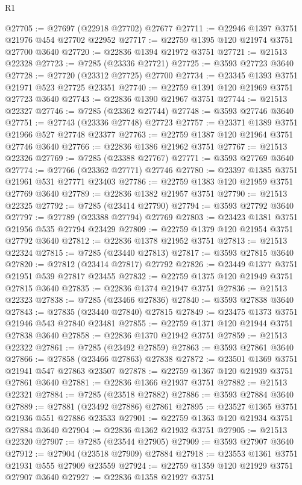 \begin{lexlean}{R1}
\begin{coremodule}
@27705 := @27697 (@22918 @27702) @27677
@27711 := @22946 @1397 @3751 @21976 @454 @27702 @22952
@27717 := @22759 @1395 @120 @21974 @3751 @27700 @3640
@27720 := @22836 @1394 @21972 @3751
@27721 := @21513 @22328
@27723 := @7285 (@23336 @27721)
@27725 := @3593 @27723 @3640
@27728 := @27720 (@23312 @27725) @27700
@27734 := @23345 @1393 @3751 @21971 @523 @27725 @23351
@27740 := @22759 @1391 @120 @21969 @3751 @27723 @3640
@27743 := @22836 @1390 @21967 @3751
@27744 := @21513 @22327
@27746 := @7285 (@23362 @27744)
@27748 := @3593 @27746 @3640
@27751 := @27743 (@23336 @27748) @27723
@27757 := @23371 @1389 @3751 @21966 @527 @27748 @23377
@27763 := @22759 @1387 @120 @21964 @3751 @27746 @3640
@27766 := @22836 @1386 @21962 @3751
@27767 := @21513 @22326
@27769 := @7285 (@23388 @27767)
@27771 := @3593 @27769 @3640
@27774 := @27766 (@23362 @27771) @27746
@27780 := @23397 @1385 @3751 @21961 @531 @27771 @23403
@27786 := @22759 @1383 @120 @21959 @3751 @27769 @3640
@27789 := @22836 @1382 @21957 @3751
@27790 := @21513 @22325
@27792 := @7285 (@23414 @27790)
@27794 := @3593 @27792 @3640
@27797 := @27789 (@23388 @27794) @27769
@27803 := @23423 @1381 @3751 @21956 @535 @27794 @23429
@27809 := @22759 @1379 @120 @21954 @3751 @27792 @3640
@27812 := @22836 @1378 @21952 @3751
@27813 := @21513 @22324
@27815 := @7285 (@23440 @27813)
@27817 := @3593 @27815 @3640
@27820 := @27812 (@23414 @27817) @27792
@27826 := @23449 @1377 @3751 @21951 @539 @27817 @23455
@27832 := @22759 @1375 @120 @21949 @3751 @27815 @3640
@27835 := @22836 @1374 @21947 @3751
@27836 := @21513 @22323
@27838 := @7285 (@23466 @27836)
@27840 := @3593 @27838 @3640
@27843 := @27835 (@23440 @27840) @27815
@27849 := @23475 @1373 @3751 @21946 @543 @27840 @23481
@27855 := @22759 @1371 @120 @21944 @3751 @27838 @3640
@27858 := @22836 @1370 @21942 @3751
@27859 := @21513 @22322
@27861 := @7285 (@23492 @27859)
@27863 := @3593 @27861 @3640
@27866 := @27858 (@23466 @27863) @27838
@27872 := @23501 @1369 @3751 @21941 @547 @27863 @23507
@27878 := @22759 @1367 @120 @21939 @3751 @27861 @3640
@27881 := @22836 @1366 @21937 @3751
@27882 := @21513 @22321
@27884 := @7285 (@23518 @27882)
@27886 := @3593 @27884 @3640
@27889 := @27881 (@23492 @27886) @27861
@27895 := @23527 @1365 @3751 @21936 @551 @27886 @23533
@27901 := @22759 @1363 @120 @21934 @3751 @27884 @3640
@27904 := @22836 @1362 @21932 @3751
@27905 := @21513 @22320
@27907 := @7285 (@23544 @27905)
@27909 := @3593 @27907 @3640
@27912 := @27904 (@23518 @27909) @27884
@27918 := @23553 @1361 @3751 @21931 @555 @27909 @23559
@27924 := @22759 @1359 @120 @21929 @3751 @27907 @3640
@27927 := @22836 @1358 @21927 @3751

\end{coremodule}
\end{lexlean}
